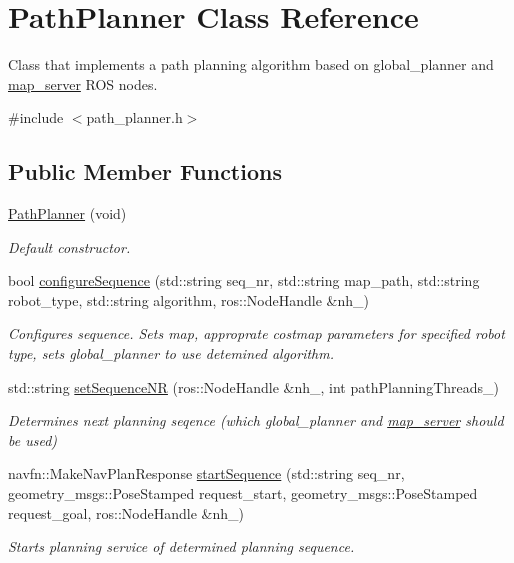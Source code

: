 \hypertarget{classPathPlanner}{\section{Path\-Planner Class Reference}
\label{classPathPlanner}
}


Class that implements a path planning algorithm based on global\-\_\-planner and \hyperlink{namespacemap__server}{map\-\_\-server} R\-O\-S nodes.  




{\ttfamily \#include $<$path\-\_\-planner.\-h$>$}

\subsection*{Public Member Functions}
\begin{DoxyCompactItemize}
\item 
\hyperlink{classPathPlanner_ad867f75b385040b840b2a3b23352357e}{Path\-Planner} (void)
\begin{DoxyCompactList}\small\item\em Default constructor. \end{DoxyCompactList}\item 
bool \hyperlink{classPathPlanner_ab62158cebe4f6c11b37014f1417e446f}{configure\-Sequence} (std\-::string seq\-\_\-nr, std\-::string map\-\_\-path, std\-::string robot\-\_\-type, std\-::string algorithm, ros\-::\-Node\-Handle \&nh\-\_\-)
\begin{DoxyCompactList}\small\item\em Configures sequence. Sets map, approprate costmap parameters for specified robot type, sets global\-\_\-planner to use detemined algorithm. \end{DoxyCompactList}\item 
std\-::string \hyperlink{classPathPlanner_adab13f270c11f92aa0463c96f0ec20e0}{set\-Sequence\-N\-R} (ros\-::\-Node\-Handle \&nh\-\_\-, int path\-Planning\-Threads\-\_\-)
\begin{DoxyCompactList}\small\item\em Determines next planning seqence (which global\-\_\-planner and \hyperlink{namespacemap__server}{map\-\_\-server} should be used) \end{DoxyCompactList}\item 
navfn\-::\-Make\-Nav\-Plan\-Response \hyperlink{classPathPlanner_a4af33ccade9ae9429d8aba91b91d50e9}{start\-Sequence} (std\-::string seq\-\_\-nr, geometry\-\_\-msgs\-::\-Pose\-Stamped request\-\_\-start, geometry\-\_\-msgs\-::\-Pose\-Stamped request\-\_\-goal, ros\-::\-Node\-Handle \&nh\-\_\-)
\begin{DoxyCompactList}\small\item\em Starts planning service of determined planning sequence. \end{DoxyCompactList}\end{DoxyCompactItemize}


